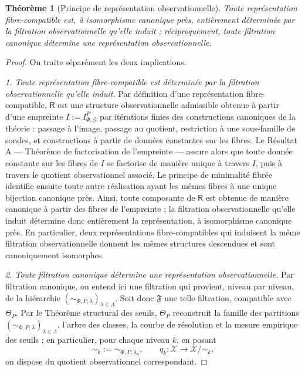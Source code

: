 \documentclass[11pt,a4paper]{article}
\newtheorem{theorem}{Théorème}
\begin{document}
\begin{appendices}
\begin{theorem}[Principe de représentation observationnelle]
Toute représentation fibre-compatible est, à isomorphisme canonique près, entièrement déterminée par la filtration observationnelle qu'elle induit ; réciproquement, toute filtration canonique détermine une représentation observationnelle.
\end{theorem}

\begin{proof}
On traite séparément les deux implications.

\medskip
\noindent\textit{1. Toute représentation fibre-compatible est déterminée par la filtration observationnelle qu'elle induit.}
Par définition d'une représentation fibre-compatible, \(\mathsf R\) est une structure observationnelle admissible obtenue à partir d'une empreinte \(I:=I_{\Phi,\mathcal G}^P\) par itérations finies des constructions canoniques de la théorie : passage à l'image, passage au quotient, restriction à une sous-famille de sondes, et constructions à partir de données constantes sur les fibres. Le Résultat A — Théorème de factorisation de l'empreinte — assure alors que toute donnée constante sur les fibres de \(I\) se factorise de manière unique à travers \(I\), puis à travers le quotient observationnel associé. Le principe de minimalité fibrée identifie ensuite toute autre réalisation ayant les mêmes fibres à une unique bijection canonique près. Ainsi, toute composante de \(\mathsf R\) est obtenue de manière canonique à partir des fibres de l'empreinte ; la filtration observationnelle qu'elle induit détermine donc entièrement la représentation, à isomorphisme canonique près. En particulier, deux représentations fibre-compatibles qui induisent la même filtration observationnelle donnent les mêmes structures descendues et sont canoniquement isomorphes.

\medskip
\noindent\textit{2. Toute filtration canonique détermine une représentation observationnelle.}
Par filtration canonique, on entend ici une filtration qui provient, niveau par niveau, de la hiérarchie \((\sim_{\Phi,P,\lambda})_{\lambda\in\Lambda}\). Soit donc \(\mathfrak F\) une telle filtration, compatible avec \(\Theta_P\). Par le Théorème structural des seuils, \(\Theta_P\) reconstruit la famille des partitions \((\sim_{\Phi,P,\lambda})_{\lambda\in\Lambda}\), l'arbre des classes, la courbe de résolution et la mesure empirique des seuils ; en particulier, pour chaque niveau \(k\), en posant
\[
\sim_k:=\sim_{\Phi,P,\lambda_k},
\qquad
q_k:\mathcal X\longrightarrow \mathcal X/{\sim_k},
\]
on dispose du quotient observationnel correspondant.


\end{proof}
\end{appendices}
\end{document}
